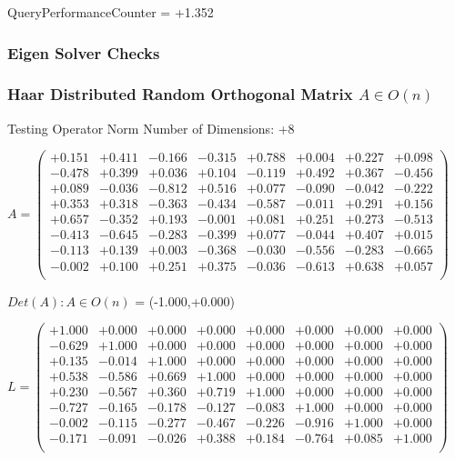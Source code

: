 \documentclass[9pt]{article}
\theoremstyle{plain}
\theoremstyle{definition}
\theoremstyle{remark}
\numberwithin{equation}{section}
\begin{document}
QueryPerformanceCounter  =  +1.352
\subsubsection{Eigen Solver Checks}
\subsubsection{Haar Distributed Random Orthogonal Matrix $A \in O(n)$}
 Testing Operator Norm
Number of Dimensions: +8

$A = \left(
\begin{array}{
cccccccc}
+0.151 & +0.411 & -0.166 & -0.315 & +0.788 & +0.004 & +0.227 & +0.098 \\
-0.478 & +0.399 & +0.036 & +0.104 & -0.119 & +0.492 & +0.367 & -0.456 \\
+0.089 & -0.036 & -0.812 & +0.516 & +0.077 & -0.090 & -0.042 & -0.222 \\
+0.353 & +0.318 & -0.363 & -0.434 & -0.587 & -0.011 & +0.291 & +0.156 \\
+0.657 & -0.352 & +0.193 & -0.001 & +0.081 & +0.251 & +0.273 & -0.513 \\
-0.413 & -0.645 & -0.283 & -0.399 & +0.077 & -0.044 & +0.407 & +0.015 \\
-0.113 & +0.139 & +0.003 & -0.368 & -0.030 & -0.556 & -0.283 & -0.665 \\
-0.002 & +0.100 & +0.251 & +0.375 & -0.036 & -0.613 & +0.638 & +0.057 \\
\end{array}
\right)$ \newline 

$Det(A) :   A \in O(n)$ = (-1.000,+0.000)

$L = \left(
\begin{array}{
cccccccc}
+1.000 & +0.000 & +0.000 & +0.000 & +0.000 & +0.000 & +0.000 & +0.000 \\
-0.629 & +1.000 & +0.000 & +0.000 & +0.000 & +0.000 & +0.000 & +0.000 \\
+0.135 & -0.014 & +1.000 & +0.000 & +0.000 & +0.000 & +0.000 & +0.000 \\
+0.538 & -0.586 & +0.669 & +1.000 & +0.000 & +0.000 & +0.000 & +0.000 \\
+0.230 & -0.567 & +0.360 & +0.719 & +1.000 & +0.000 & +0.000 & +0.000 \\
-0.727 & -0.165 & -0.178 & -0.127 & -0.083 & +1.000 & +0.000 & +0.000 \\
-0.002 & -0.115 & -0.277 & -0.467 & -0.226 & -0.916 & +1.000 & +0.000 \\
-0.171 & -0.091 & -0.026 & +0.388 & +0.184 & -0.764 & +0.085 & +1.000 \\
\end{array}
\right)$ \newline 
\end{document}
